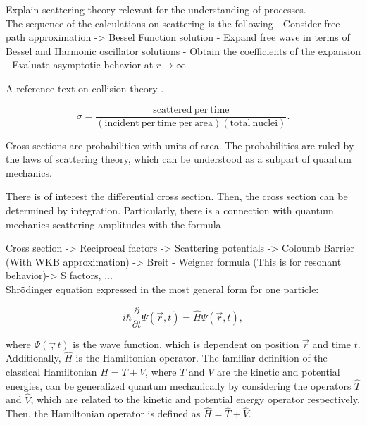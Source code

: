\documentclass[openany]{book}
\begin{document}
Explain scattering theory relevant for the understanding of  processes. \\

The sequence of the calculations on scattering is the following
-	Consider free path approximation -> Bessel Function solution  
-	Expand free wave in terms of Bessel and Harmonic oscillator solutions
-	Obtain the coefficients of the expansion 
-	Evaluate asymptotic behavior at $r \rightarrow \infty$

A reference text on collision theory \cite{joachain_1983}.

\begin{equation} \label{eq:crossSection_definition}
	\sigma  = \frac{\mathrm{scattered \ per \ time}}{(\mathrm{incident \ per \ time \ per \ area} )(\mathrm{total \ nuclei})}.
\end{equation}

Cross sections are probabilities with units of area. 
The probabilities are ruled by the laws of scattering theory, which can be understood as a subpart of quantum mechanics. 

There is of interest the differential cross section.  Then, the cross section can be determined by integration. Particularly, there is a connection with quantum mechanics scattering amplitudes with the formula


Cross section -> Reciprocal factors -> Scattering potentials -> Coloumb Barrier (With WKB approximation) -> Breit - Weigner formula (This is for resonant behavior)-> S factors, ... \\ 

Shrödinger equation expressed in the most general form for one particle:  

\begin{equation}\label{eq:scattering_Schrodinger_general}
	i \hbar \frac{\partial}{\partial t} \Psi (\vec r, t)= \hat H \Psi (\vec r, t),
\end{equation}

where $\Psi(\vec, t)$ is the wave function, which is dependent on position $\vec r$ and time $t$. Additionally, $\hat H$ is the Hamiltonian operator. The familiar definition of the classical Hamiltonian $H = T + V$, where $T$ and $V$ are the kinetic and potential energies, can be generalized quantum mechanically by considering the operators $\hat T$ and $\hat V$, which are related to the kinetic and potential energy operator respectively. Then, the Hamiltonian operator is defined as $\hat H = \hat T + \hat V$. \\
\end{document}
